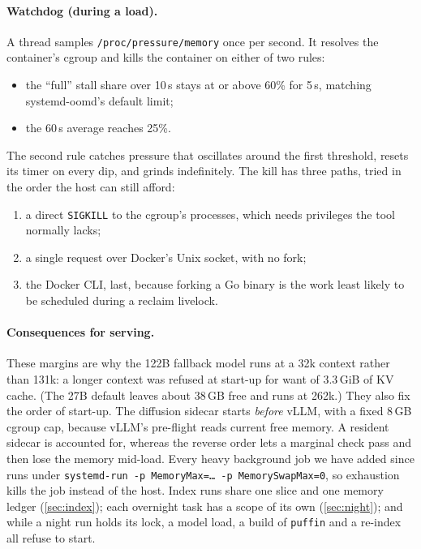 \documentclass[11pt]{article}
\newcommand{\code}[1]{\texttt{#1}}
\begin{document}
\paragraph{Watchdog (during a load).} A thread samples \code{/proc/pressure/memory} once per second.
It resolves the container's cgroup and kills the container on either of two rules:
\begin{itemize}
  \item the ``full'' stall share over 10\,s stays at or above 60\% for 5\,s, matching systemd-oomd's
    default limit;
  \item the 60\,s average reaches 25\%.
\end{itemize}
The second rule catches pressure that oscillates around the first threshold, resets its timer on
every dip, and grinds indefinitely. The kill has three paths, tried in the order the host can still
afford:
\begin{enumerate}
  \item a direct \code{SIGKILL} to the cgroup's processes, which needs privileges the tool normally
    lacks;
  \item a single request over Docker's Unix socket, with no fork;
  \item the Docker CLI, last, because forking a Go binary is the work least likely to be scheduled
    during a reclaim livelock.
\end{enumerate}

\paragraph{Consequences for serving.} These margins are why the 122B fallback model runs at a 32k
context rather than 131k: a longer context was refused at start-up for want of 3.3\,GiB of KV
cache. (The 27B default leaves about 38\,GB free and runs at 262k.) They also
fix the order of start-up. The diffusion sidecar starts \emph{before} vLLM, with a fixed 8\,GB
cgroup cap, because vLLM's pre-flight reads current free memory. A resident sidecar is accounted
for, whereas the reverse order lets a marginal check pass and then lose the memory mid-load.
Every heavy background job we have added since runs under
\code{systemd-run -p MemoryMax=\ldots{} -p MemorySwapMax=0}, so exhaustion kills the job instead
of the host. Index runs share one slice and one memory ledger (\cref{sec:index}); each overnight
task has a scope of its own (\cref{sec:night}); and while a night run holds its lock, a model
load, a build of \code{puffin} and a re-index all refuse to start.
\end{document}
